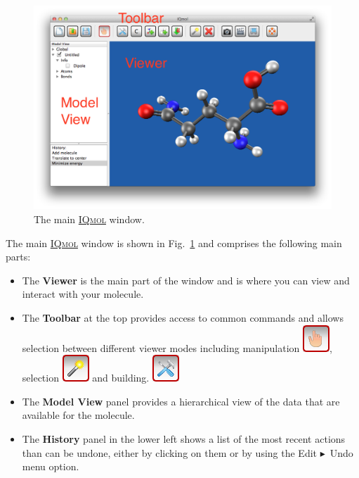 \documentclass[a4paper,12pt]{article}
\newcommand{\iqmol}{\href{http://iqmol.org}{{\scshape IQmol}}}
\newcommand{\bt}{\ensuremath{\blacktriangleright}}
\begin{document}
\begin{figure}[ht]
\begin{center}
\includegraphics[scale=0.40]{figures/Viewer.png}
\caption{The main \iqmol{} window.}
\label{fig:main}
\end{center}
\end{figure}
The main \iqmol{} window is shown in Fig.~\ref{fig:main} and comprises the
following main parts:
\begin{itemize}
\item The {\bf Viewer} is the main part of the window and is where you can
      view and interact with your molecule.
\item The {\bf Toolbar} at the top provides access to common commands and allows selection
      between different viewer modes including manipulation 
      \includegraphics[scale=0.40]{figures/ManipulateButton.png}, selection 
      \includegraphics[scale=0.40]{figures/SelectButton.png} and building.
      \includegraphics[scale=0.40]{figures/BuildButton.png}
\item The {\bf Model View} panel provides a hierarchical view of the data that
      are available for the molecule.
\item The {\bf History} panel in the lower left shows a list of the most recent
      actions than can be undone, either by clicking on them or by using the
      Edit \bt\ Undo menu option. 
\end{itemize}
\end{document}
